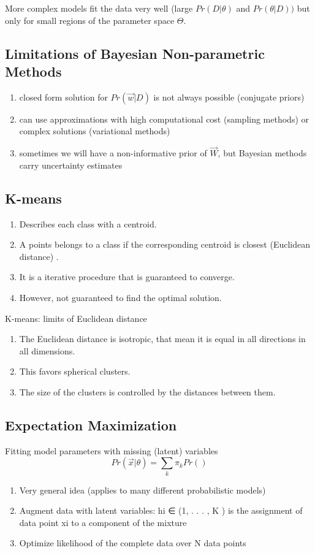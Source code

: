 \documentclass[12pt]{article}
\numberwithin{equation}{section}
\begin{document}
More complex models fit the data very well (large $Pr(D|\theta)$ and $Pr(\theta|D))$ but only for small regions of the parameter space $\Theta$.

\subsection{Limitations of Bayesian Non-parametric Methods}
\begin{enumerate}
\item closed form solution for $Pr(\vec{w}|D)$ is not always possible (conjugate priors)
\item can use approximations with high computational cost (sampling methods) or complex solutions (variational methods)
\item sometimes we will have a non-informative prior of $\vec{W}$, but Bayesian methods carry uncertainty estimates
\end{enumerate}

\subsection{K-means}
\begin{enumerate}
    \item Describes each class with a centroid.
    \item A points belongs to a class if the corresponding centroid is closest (Euclidean distance) . 
    \item It is a iterative procedure that is guaranteed to converge.
    \item However, not guaranteed to find the optimal solution.
\end{enumerate}

K-means: limits of Euclidean distance

\begin{enumerate}
    \item The Euclidean distance is isotropic, that mean it is equal in all directions in all dimensions.
    \item This favors spherical clusters.
    \item The size of the clusters is controlled by the distances between them.
\end{enumerate}


\subsection{Expectation Maximization}
Fitting model parameters with missing (latent) variables
\begin{equation}
Pr(\vec{x} | \theta )  = \sum_k \pi_k Pr()
\end{equation}
\begin{enumerate}
\item Very general idea (applies to many different probabilistic
models)
\item Augment data with latent variables: hi ∈ (1, . . . , K ) is the
assignment of data point xi to a component of the mixture
\item Optimize likelihood of the complete data over N data points
\end{enumerate}
\end{document}
